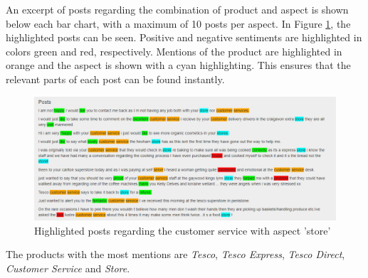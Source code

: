 \documentclass[10pt,a4paper]{article}
\begin{document}
	An excerpt of posts regarding the combination of product and aspect is shown below each bar chart, with a maximum of 10 posts per aspect. In Figure \ref{fig:posts}, the highlighted posts can be seen. Positive and negative sentiments are highlighted in colors green and red, respectively. Mentions of the product are highlighted in orange and the aspect is shown with a cyan highlighting. This ensures that the relevant parts of each post can be found instantly.
			
		\begin{figure}[h]
			\centering
			\includegraphics[width=0.9\linewidth]{data/posts}
			\caption{Highlighted posts regarding the customer service with aspect 'store'}
			\label{fig:posts}
		\end{figure}
		
				
		The products with the most mentions are \textit{Tesco}, \textit{Tesco Express}, \textit{Tesco Direct}, \textit{Customer Service} and \textit{Store}.
		
\end{document}
